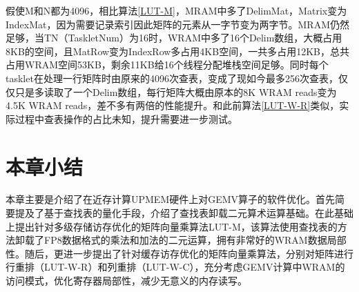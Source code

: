 假使M和N都为4096，相比算法\ref{LUT-M}，MRAM中多了DelimMat，Matrix变为IndexMat，因为需要记录索引因此矩阵的元素从一字节变为两字节。MRAM仍然足够，当TN（TaskletNum）为16时，WRAM中多了16个Delim数组，大概占用8KB的空间，且MatRow变为IndexRow多占用4KB空间，一共多占用12KB，总共占用WRAM空间53KB，剩余11KB给16个线程分配堆栈空间足够。同时每个tasklet在处理一行矩阵时由原来的4096次查表，变成了现如今最多256次查表，仅仅只是多读取了一个Delim数组，每行矩阵大概由原本的8K WRAM reads变为4.5K WRAM reads，差不多有两倍的性能提升。和此前算法\ref{LUT-W-R}类似，实际过程中查表操作的占比未知，提升需要进一步测试。

\section{本章小结}
本章主要是介绍了在近存计算UPMEM硬件上对GEMV算子的软件优化。首先简要提及了基于查找表的量化手段，介绍了查找表卸载二元算术运算基础。在此基础上提出针对多级存储访存优化的矩阵向量乘算法LUT-M，该算法使用查找表的方法卸载了FP8数据格式的乘法和加法的二元运算，拥有非常好的WRAM数据局部性。随后，更进一步提出了针对缓存访存优化的矩阵向量乘算法，分别对矩阵进行行重排（LUT-W-R）和列重排（LUT-W-C），充分考虑GEMV计算中WRAM的访问模式，优化寄存器局部性，减少无意义的内存读写。